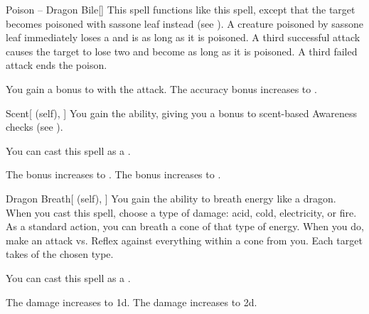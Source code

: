 \lowercase{\hypertarget{spell:Poison -- Dragon Bile}{}}\label{spell:Poison -- Dragon Bile}
\begin{freeability}[Rank 3]{\hypertarget{spell:Poison -- Dragon Bile}{Poison -- Dragon Bile}}[]
This spell functions like this  spell, except that the target becomes poisoned with sassone leaf instead (see ).
A creature poisoned by sassone leaf immediately loses a  and is  as long as it is poisoned.
A third successful attack causes the target to lose two  and become  as long as it is poisoned.
A third failed attack ends the poison.

\rankline
{} You gain a  bonus to  with the attack.
 The accuracy bonus increases to .

\end{freeability}
\vspace{0.25em}



\lowercase{\hypertarget{spell:Scent}{}}\label{spell:Scent}
\begin{attuneability}[Rank 3]{\hypertarget{spell:Scent}{Scent}}[ (self), ]
You gain the  ability, giving you a  bonus to scent-based Awareness checks (see ).

You can cast this spell as a .

\rankline
{} The bonus increases to .
 The bonus increases to .

\end{attuneability}
\vspace{0.25em}



\lowercase{\hypertarget{spell:Dragon Breath}{}}\label{spell:Dragon Breath}
\begin{attuneability}[Rank 4]{\hypertarget{spell:Dragon Breath}{Dragon Breath}}[ (self), ]
You gain the ability to breath energy like a dragon.
When you cast this spell, choose a type of damage: acid, cold, electricity, or fire.
As a standard action, you can breath a cone of that type of energy.
When you do, make an attack vs. Reflex against everything within a \arealarge cone from you.
\hit Each target takes  of the chosen type.

You can cast this spell as a .

\rankline
{} The damage increases to  \plus1d.
 The damage increases to  \plus2d.

\end{attuneability}
\vspace{0.25em}



